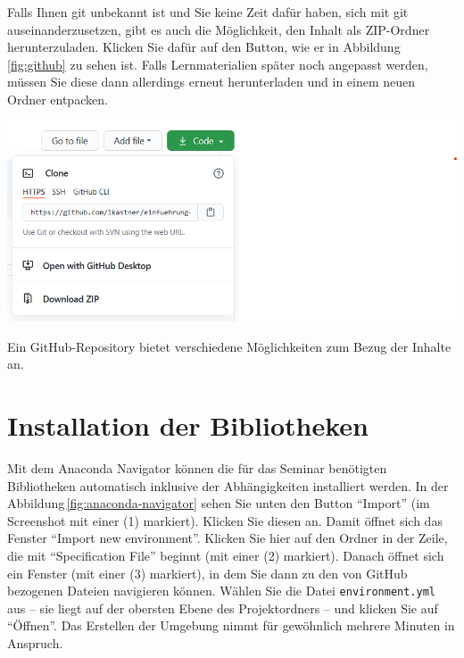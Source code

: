 \documentclass{tufte-handout}
\begin{document}
Falls Ihnen git unbekannt ist und Sie keine Zeit dafür haben, sich mit git auseinanderzusetzen, gibt es auch die Möglichkeit, den Inhalt als ZIP-Ordner herunterzuladen.
Klicken Sie dafür auf den Button, wie er in Abbildung\,\ref{fig:github} zu sehen ist.
Falls Lernmaterialien später noch angepasst werden, müssen Sie diese dann allerdings erneut herunterladen und in einem neuen Ordner entpacken.

\begin{marginfigure}
  \includegraphics{github-zip}
  \caption{Ein GitHub-Repository bietet verschiedene Möglichkeiten zum Bezug der Inhalte an.}%
\label{fig:github}
\end{marginfigure}


\section{Installation der Bibliotheken}

Mit dem Anaconda Navigator können die für das Seminar  benötigten Bibliotheken automatisch inklusive der Abhängigkeiten installiert werden.
In der Abbildung\,\ref{fig:anaconda-navigator} sehen Sie unten den Button \enquote{Import} (im Screenshot mit einer (1) markiert).
Klicken Sie diesen an.
Damit öffnet sich das Fenster \enquote{Import new environment}.
Klicken Sie hier auf den Ordner in der Zeile, die mit 
\enquote{Specification File}
beginnt (mit einer (2) markiert).
Danach öffnet sich ein Fenster (mit einer (3) markiert), in dem Sie dann zu den von GitHub bezogenen Dateien navigieren können.
Wählen Sie die Datei \texttt{environment.yml} aus
-- sie liegt auf der obersten Ebene des Projektordners --
und klicken Sie auf \enquote{Öffnen}.
Das Erstellen der Umgebung nimmt für gewöhnlich mehrere Minuten in Anspruch.
\end{document}
